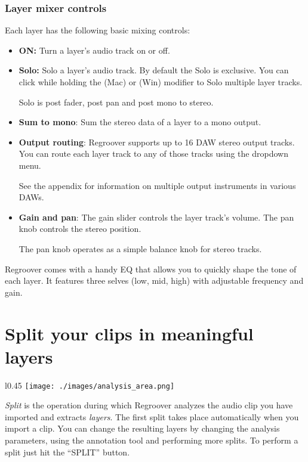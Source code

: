 \documentclass[12pt]{article}
\newcommand{\textimage}[3]{
\raisebox{#1}{\texttt{[image: \#3]}}
}
\begin{document}
\subsubsection*{Layer mixer controls}
Each layer has the following basic mixing controls:
\begin{itemize}
\item \textbf{ON:} \textimage{-5pt}{1}{./images/layer_on.png} Turn a layer's audio track on or off.
\item \textbf{Solo:} \textimage{-5pt}{1}{./images/layer_solo.png} Solo a layer's audio track. By default the Solo is exclusive. You can click while holding the \keys{\cmd} (Mac) or \keys{\ctrl} (Win) modifier to Solo multiple layer tracks.
\begin{mdframed}[style = info]
Solo is post fader, post pan and post mono to stereo.
\end{mdframed}
\item \textbf{Sum to mono}:  \textimage{-5pt}{1}{./images/layer_s2m.png} Sum the stereo data of a layer to a mono output.
\item \textbf{Output routing}:  \textimage{-5pt}{1}{./images/layer_out.png} Regroover supports up to 16 DAW stereo output tracks. You can route each layer track to any of those tracks using the dropdown menu.
\begin{mdframed}[style = info]
See the appendix for information on multiple output instruments in various DAWs.
\end{mdframed}
\item \textbf{Gain and pan}: The gain slider controls the layer track's volume. The pan knob controls the stereo position.
\begin{mdframed}[style = info]
The pan knob operates as a simple balance knob for stereo tracks.
\end{mdframed}
\end{itemize}

Regroover comes with a handy EQ that allows you to quickly shape the tone of each layer. It features three selves (low, mid, high) with adjustable frequency and gain.

\section*{Split your clips in meaningful layers}
\begin{wrapfigure}{l}{0.45\textwidth}
\centering
\texttt{[image: ./images/analysis\_area.png]}
\end{wrapfigure} \textit{Split} is the operation during which Regroover analyzes the audio clip you have imported and extracts \textit{layers}. The first split takes place automatically when you import a clip. You can change the resulting layers by changing the analysis parameters, using the annotation tool and performing more splits. To perform a split just hit the ``SPLIT'' button.
\end{document}
